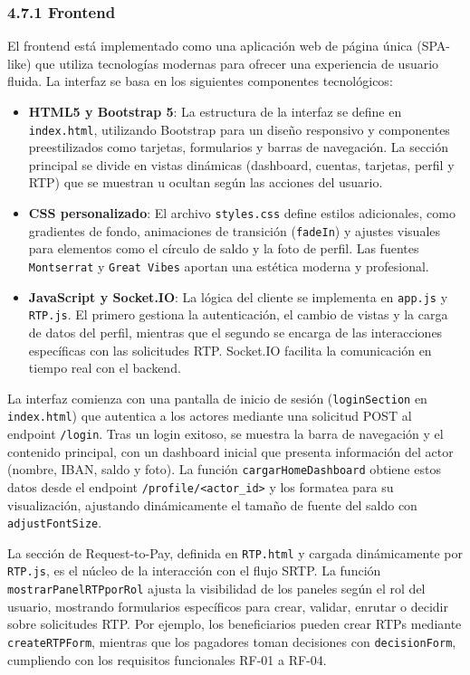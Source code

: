 \subsubsection*{4.7.1 \; Frontend}

El frontend está implementado como una aplicación web de página única (SPA-like) que utiliza tecnologías modernas para ofrecer una experiencia de usuario fluida. La interfaz se basa en los siguientes componentes tecnológicos:

\begin{itemize}
    \item \textbf{HTML5 y Bootstrap 5}: La estructura de la interfaz se define en \texttt{index.html}, utilizando Bootstrap para un diseño responsivo y componentes preestilizados como tarjetas, formularios y barras de navegación. La sección principal se divide en vistas dinámicas (dashboard, cuentas, tarjetas, perfil y RTP) que se muestran u ocultan según las acciones del usuario.
    \item \textbf{CSS personalizado}: El archivo \texttt{styles.css} define estilos adicionales, como gradientes de fondo, animaciones de transición (\texttt{fadeIn}) y ajustes visuales para elementos como el círculo de saldo y la foto de perfil. Las fuentes \texttt{Montserrat} y \texttt{Great Vibes} aportan una estética moderna y profesional.
    \item \textbf{JavaScript y Socket.IO}: La lógica del cliente se implementa en \texttt{app.js} y \texttt{RTP.js}. El primero gestiona la autenticación, el cambio de vistas y la carga de datos del perfil, mientras que el segundo se encarga de las interacciones específicas con las solicitudes RTP. Socket.IO facilita la comunicación en tiempo real con el backend.
\end{itemize}

La interfaz comienza con una pantalla de inicio de sesión (\texttt{loginSection} en \texttt{index.html}) que autentica a los actores mediante una solicitud POST al endpoint \texttt{/login}. Tras un login exitoso, se muestra la barra de navegación y el contenido principal, con un dashboard inicial que presenta información del actor (nombre, IBAN, saldo y foto). La función \texttt{cargarHomeDashboard} obtiene estos datos desde el endpoint \texttt{/profile/<actor\_id>} y los formatea para su visualización, ajustando dinámicamente el tamaño de fuente del saldo con \texttt{adjustFontSize}.

La sección de Request-to-Pay, definida en \texttt{RTP.html} y cargada dinámicamente por \texttt{RTP.js}, es el núcleo de la interacción con el flujo SRTP. La función \texttt{mostrarPanelRTPporRol} ajusta la visibilidad de los paneles según el rol del usuario, mostrando formularios específicos para crear, validar, enrutar o decidir sobre solicitudes RTP. Por ejemplo, los beneficiarios pueden crear RTPs mediante \texttt{createRTPForm}, mientras que los pagadores toman decisiones con \texttt{decisionForm}, cumpliendo con los requisitos funcionales RF-01 a RF-04.

